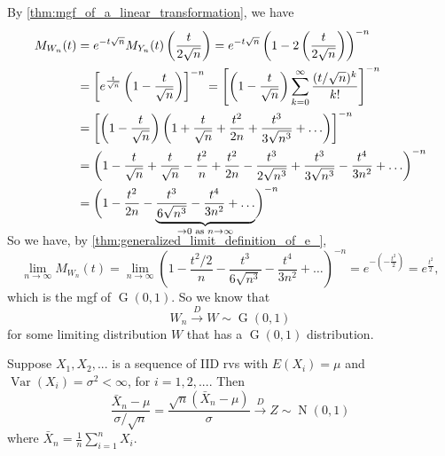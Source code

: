 \documentclass[notoc,notitlepage]{tufte-book}
\DeclareMathOperator{\Nor}{N }
\DeclareMathOperator{\Gau}{G }
\DeclareMathOperator{\Var}{Var }
\newcommand{\convd}{\overset{D}{\to}}
\begin{document}
\begin{solution}
  By \cref{thm:mgf_of_a_linear_transformation}, we have
  \begin{align*}
    M_{W_n}(t) &= e^{ - t \sqrt{n} } M_{ Y_n } (t) \left( \frac{t}{2 \sqrt{n}} \right) = e^{- t \sqrt{n}} \left( 1 - 2 \left( \frac{t}{2 \sqrt{n}} \right) \right)^{-n} \\
               &= \left[ e^{\frac{t}{\sqrt{n}}} \left( 1 - \frac{t}{\sqrt{n}} \right) \right]^{-n} = \left[ \left(1 - \frac{t}{\sqrt{n}}\right) \sum_{k=0}^{\infty} \frac{(t / \sqrt{n})^k}{k!} \right]^{-n} \\
               &= \left[ \left( 1 - \frac{t}{\sqrt{n}} \right) \left( 1 + \frac{t}{\sqrt{n}} + \frac{t^2}{2n} + \frac{t^3}{3 \sqrt{n^3}} + \hdots \right) \right]^{-n} \\
               &= \left( 1 - \frac{t}{\sqrt{n}} + \frac{t}{\sqrt{n}} - \frac{t^2}{n} + \frac{t^2}{2 n} - \frac{t^3}{2 \sqrt{n^3}} + \frac{t^3}{3 \sqrt{n^3}} - \frac{t^4}{3 n^2} + \hdots \right)^{-n} \\
               &= \left( 1 - \frac{t^2}{2n} - \smash{ \underbrace{ \frac{t^3}{6 \sqrt{n^3}} - \frac{t^4}{3n^2} + \hdots }_{\to 0 \text{ as } n \to \infty} } \right)^{-n}
  \end{align*}

  \noindent So we have, by \cref{thm:generalized_limit_definition_of_e_},
  \begin{equation*}
    \lim_{n \to \infty} M_{W_n}(t) = \lim_{n \to \infty} ( 1 - \frac{t^2 / 2}{n} - \frac{t^3}{6 \sqrt{n^3}} - \frac{t^4}{3 n^2} + \hdots )^{-n} = e^{-(- \frac{t^2}{2})} = e^{\frac{t^2}{2}},
  \end{equation*}
  which is the mgf of $\Gau(0, 1)$. So we know that
  \begin{equation*}
    W_n \convd W \sim \Gau(0, 1)
  \end{equation*}
  for some limiting distribution $W$ that has a $\Gau(0, 1)$ distribution.
\end{solution}

\begin{thm}
\label{thm:central_limit_theorem}
Suppose $X_1, X_2,...$ is a sequence of IID rvs with $E(X_i) = \mu$ and $\Var(X_i) = \sigma^2 < \infty$, for $i = 1, 2, ...$. Then
\begin{equation*}
  \frac{\bar{X}_n - \mu}{\sigma / \sqrt{n}} = \frac{\sqrt{n} ( \bar{X}_n - \mu )}{\sigma} \convd Z \sim \Nor(0, 1)
\end{equation*}
where $\bar{X}_n = \frac{1}{n} \sum_{i=1}^{n} X_i$.
\end{thm}
\end{document}
